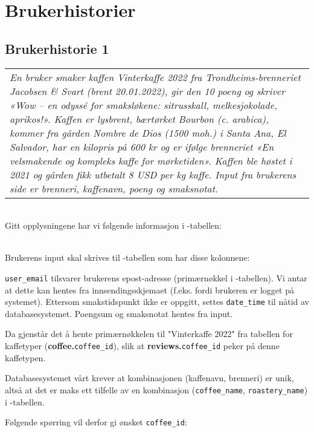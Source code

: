 \section{Brukerhistorier}

\subsection{Brukerhistorie 1}

\begin{tabular}{ | p{} }
    \textsl{En bruker smaker kaffen Vinterkaffe 2022 fra Trondheims-brenneriet Jacobsen \& Svart (brent 20.01.2022), gir den 10 poeng og skriver «Wow – en odyssé for smaksløkene: sitrusskall, melkesjokolade, aprikos!».
    Kaffen er lysbrent, bærtørket Bourbon (c. arabica), kommer fra gården Nombre de Dios (1500 moh.) i Santa Ana, El Salvador, har en kilopris på 600 kr og er ifølge brenneriet «En velsmakende og kompleks kaffe for mørketiden».
    Kaffen ble høstet i 2021 og gården fikk utbetalt 8 USD per kg kaffe.
    Input fra brukerens side er brenneri, kaffenavn, poeng og smaksnotat.}
\end{tabular} \\

Gitt opplysningene har vi følgende informasjon i -tabellen:

 \\

Brukerens input skal skrives til -tabellen som har disse kolonnene:



\verb|user_email| tilsvarer brukerens epost-adresse (primærnøkkel i -tabellen).
Vi antar at dette kan hentes fra innsendingsskjemaet (f.eks. fordi brukeren er logget på systemet).
Ettersom smakstidspunkt ikke er oppgitt, settes \verb|date_time| til nåtid av databasesystemet. Poengsum og smaksnotat hentes fra input.

Da gjenstår det å hente primærnøkkelen til "Vinterkaffe 2022" fra tabellen for kaffetyper (\textbf{coffee.}\verb|coffee_id|), slik at \textbf{reviews.}\verb|coffee_id| peker på denne kaffetypen.

Databasesystemet vårt krever at kombinasjonen (kaffenavn, brenneri) er unik,
altså at det er maks ett tilfelle av en kombinasjon (\verb|coffee_name|, \verb|roastery_name|) i -tabellen.

Følgende spørring vil derfor gi ønsket \verb|coffee_id|: \\

